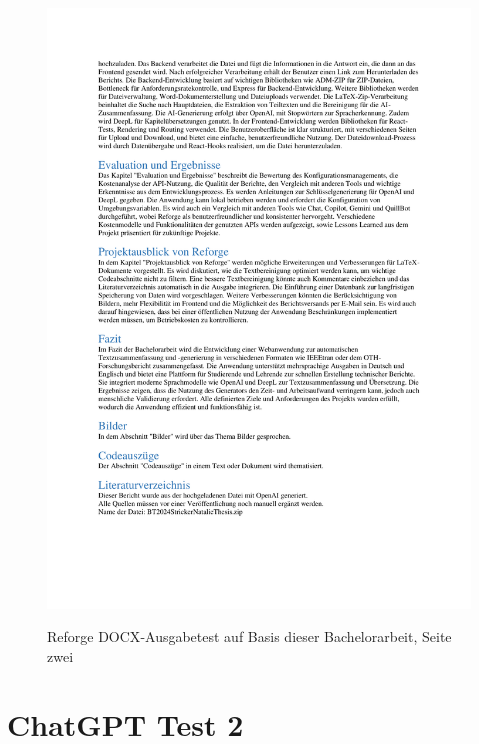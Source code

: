 \begin{figure}[H]
\centering
\includegraphics[width=0.9\linewidth]{Images/ReforgeDOCXGen2.pdf}\\
\caption{Reforge \ac{DOCX}-Ausgabetest auf Basis dieser Bachelorarbeit, Seite zwei}
\label{fig:ReforgeDOCXGen2}
\end{figure}

\section{ChatGPT Test 2}

